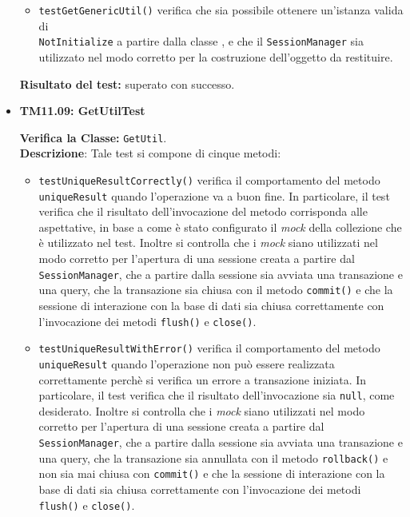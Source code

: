 \begin{itemize}
\begin{itemize}
\item \texttt{testGetGenericUtil()} verifica che sia possibile ottenere un'istanza valida di \\ \texttt{NotInitialize} a partire dalla classe , e che il \texttt{SessionManager} sia utilizzato nel modo corretto per la costruzione dell'oggetto da restituire.

\end{itemize}
\textbf{Risultato del test:} superato con successo.

\item \textbf{TM11.09: GetUtilTest} 

\textbf{Verifica la Classe:} \texttt{GetUtil}.\\
\textbf{Descrizione}: %
Tale test si compone di cinque metodi:
\begin{itemize}
\item \texttt{testUniqueResultCorrectly()} verifica il comportamento del metodo \texttt{uniqueResult} quando l'operazione va a buon fine. In particolare, il test verifica che il risultato dell'invocazione del metodo corrisponda alle aspettative, in base a come è stato configurato il \textit{mock} della collezione che è utilizzato nel test.
Inoltre si controlla che i \textit{mock} siano utilizzati nel modo corretto per l'apertura di una sessione creata a partire dal \texttt{SessionManager}, che a partire dalla sessione sia avviata una transazione e una query, che la transazione sia chiusa con il metodo \texttt{commit()} e che la sessione di interazione con la base di dati sia chiusa correttamente con l'invocazione dei metodi \texttt{flush()} e \texttt{close()}. 

\item \texttt{testUniqueResultWithError()} verifica il comportamento del metodo \texttt{uniqueResult} quando l'operazione non può essere realizzata correttamente perchè si verifica un errore a transazione iniziata. In particolare, il test verifica che il risultato dell'invocazione sia \texttt{null}, come desiderato. Inoltre si controlla che i \textit{mock} siano utilizzati nel modo corretto per l'apertura di una sessione creata a partire dal \texttt{SessionManager}, che a partire dalla sessione sia avviata una transazione e una query, che la transazione sia annullata con il metodo \texttt{rollback()} e non sia mai chiusa con \texttt{commit()} e che la sessione di interazione con la base di dati sia chiusa correttamente con l'invocazione dei metodi \texttt{flush()} e \texttt{close()}.


\end{itemize}
\end{itemize}
